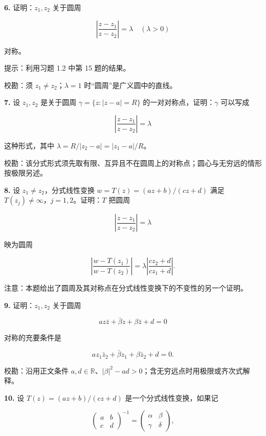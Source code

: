 \documentclass[11pt,a4paper]{article}
\begin{document}
\par{}
\noindent\textbf{6.} 证明：\(z_1,z_2\) 关于圆周

\[
\left|\frac{z-z_1}{z-z_2}\right|=\lambda\quad(\lambda>0)
\]

对称。

提示：利用习题 1.2 中第 15 题的结果。

校勘：须 \(z_1\ne z_2\)；\(\lambda=1\) 时``圆周''是广义圆中的直线。

\par{}
\noindent\textbf{7.} 设 \(z_1,z_2\) 是关于圆周 \(\gamma=\{z:|z-a|=R\}\)
的一对对称点，证明：\(\gamma\) 可以写成

\[
\left|\frac{z-z_1}{z-z_2}\right|=\lambda
\]

这种形式，其中 \(\lambda=R/|z_2-a|=|z_1-a|/R\)。

校勘：该分式形式须先取有限、互异且不在圆周上的对称点；圆心与无穷远的情形按极限另述。

\par{}
\noindent\textbf{8.} 设 \(z_1\ne z_2\)，分式线性变换 \(w=T(z)=(az+b)/(cz+d)\)
满足 \(T(z_j)\ne\infty\)，\(j=1,2\)。证明：\(T\) 把圆周

\[
\left|\frac{z-z_1}{z-z_2}\right|=\lambda
\]

映为圆周

\[
\left|\frac{w-T(z_1)}{w-T(z_2)}\right|=\lambda\left|\frac{cz_2+d}{cz_1+d}\right|.
\]

注意：本题给出了圆周及其对称点在分式线性变换下的不变性的另一个证明。

\par{}
\noindent\textbf{9.} 证明：\(z_1,z_2\) 关于圆周

\[
az\bar z+\bar\beta z+\beta\bar z+d=0
\]

对称的充要条件是

\[
az_1\bar z_2+\bar\beta z_1+\beta\bar z_2+d=0.
\]

校勘：沿用正文条件
\(a,d\in\mathbb R\)、\(|\beta|^2-ad>0\)；含无穷远点时用极限或齐次式解释。

\par{}
\noindent\textbf{10.} 设 \(T(z)=(az+b)/(cz+d)\) 是一个分式线性变换，如果记

\[
\begin{pmatrix}a&b\\c&d\end{pmatrix}^{-1}=\begin{pmatrix}\alpha&\beta\\\gamma&\delta\end{pmatrix},
\]
\end{document}
